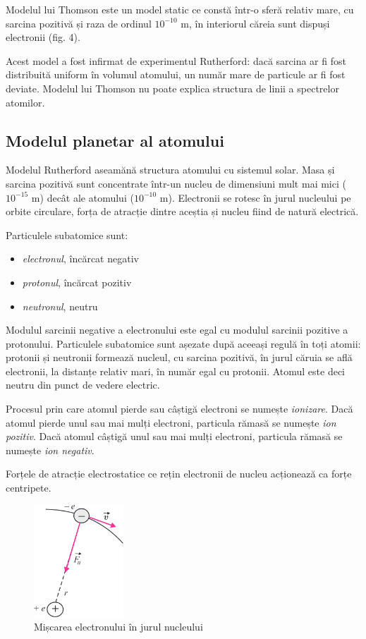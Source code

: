 Modelul lui Thomson este un model static ce constă într-o sferă relativ mare,
cu sarcina pozitivă și raza de ordinul $10^{-10}$ m, în interiorul căreia sunt
dispuși electronii (fig. 4).

Acest model a fost infirmat de experimentul
Rutherford: dacă sarcina ar fi fost distribuită uniform în volumul atomului, un
număr mare de particule {\alpha} ar fi fost deviate. Modelul lui Thomson nu
poate explica structura de linii a spectrelor atomilor.

\clearpage

\subsection{Modelul planetar al atomului}

Modelul Rutherford aseamănă structura atomului cu sistemul solar. Masa și
sarcina pozitivă sunt concentrate într-un nucleu de dimensiuni mult mai mici
($10^{-15}$ m) decât ale atomului ($10^{-10}$ m). Electronii se rotesc în jurul
nucleului pe orbite circulare, forța de atracție dintre aceștia și nucleu fiind
de natură electrică.

Particulele subatomice sunt:
\begin{itemize}
    \item \emph{electronul}, încărcat negativ
    \item \emph{protonul}, încărcat pozitiv
    \item \emph{neutronul}, neutru
\end{itemize}

Modulul sarcinii negative a electronului este egal cu modulul sarcinii pozitive
a protonului. Particulele subatomice sunt așezate după aceeași regulă în toți
atomii: protonii și neutronii formează nucleul, cu sarcina pozitivă, în jurul
căruia se află electronii, la distanțe relativ mari, în număr egal cu protonii.
Atomul este deci neutru din punct de vedere electric.

Procesul prin care atomul pierde sau câștigă electroni se numește
\emph{ionizare}. Dacă atomul pierde unul sau mai mulți electroni, particula
rămasă se numește \emph{ion pozitiv}. Dacă atomul câștigă unul sau mai mulți
electroni, particula rămasă se numește \emph{ion negativ}.

Forțele de atracție electrostatice ce rețin electronii de nucleu acționează ca
forțe centripete.

\begin{figure}
    \centering
    \includegraphics[width=0.3\textwidth]{fig/model_planetar}
    \caption{Mișcarea electronului în jurul nucleului}
\end{figure}

